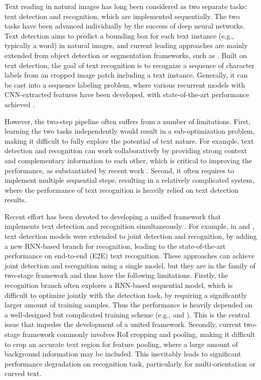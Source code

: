 \documentclass[10pt,twocolumn,letterpaper]{article}
\begin{document}
Text reading in natural images has long been considered as two separate tasks: text detection and recognition, which are
implemented sequentially. The two tasks have been advanced individually by the success of deep neural networks. Text detection aims to predict a bounding box for each text instance (e.g., typically a word) in natural images, and current leading approaches are mainly extended from object detection or segmentation frameworks, such as \cite{lyu2018mask, zhou2017east, liu2018fots}. Built on text detection, the goal of text recognition is to recognize a sequence of character labels from an cropped image patch including a text instance. Generally, it can be cast into a sequence labeling problem, where various recurrent models with CNN-extracted features have been developed, with state-of-the-art performance achieved \cite{shi2018aster, cheng2017iccv, shi2017end, he2016reading}.

However, the two-step pipeline often suffers from a number of limitations. First, learning the two tasks independently would result in a sub-optimization problem, making it difficult to fully explore the potential of text nature. For example, text detection and recognition can work collaboratively by providing strong context and complementary information to each other, which is critical to improving the performance, as substantiated by recent work \cite{he2018end, liu2018fots}. Second, it often requires to implement multiple sequential steps, resulting in a relatively complicated system, where the performance of text recognition is heavily relied on text detection results.

Recent effort has been devoted to developing a unified framework that implements text detection and recognition simultaneously \cite{he2018end, liu2018fots, lyu2018mask}. For example, in \cite{he2018end} and \cite{liu2018fots},  text detection models were extended to joint detection and recognition, by adding a new RNN-based branch for recognition, leading to the state-of-the-art performance on end-to-end (E2E) text recognition. These approaches can achieve joint detection and recognition using a single model, but they are in the family of two-stage framework and thus have the following limitations.
Firstly, the recognition branch often explores a RNN-based sequential model, which is difficult to optimize jointly with the detection task, by requiring a significantly larger amount of training samples. Thus the performance is heavily depended on a well-designed but complicated training scheme (e.g., \cite{he2018end} and \cite{li2017towards}). This is the central issue that impedes the development of a united framework.
Secondly, current two-stage framework commonly involves RoI cropping and pooling, making it difficult to crop an accurate text region for feature pooling, where a large amount of background information may be included. This inevitably leads to significant performance degradation on recognition task, particularly for multi-orientation or curved text.
\end{document}
